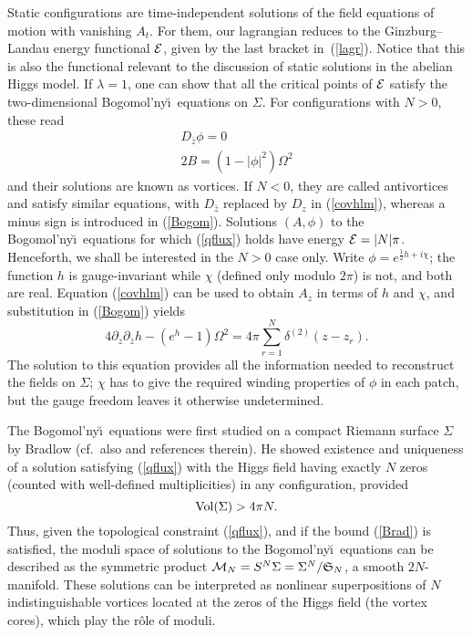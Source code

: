 \documentclass[a4paper,11pt]{article}
\begin{document}
Static configurations are time-independent solutions of the field 
equations of motion with vanishing $A_{t}$. For them, our lagrangian 
reduces to the
Ginzburg--Landau energy functional ${\cal E}$, given by the last 
bracket in~(\ref{lagr}). Notice that this is also the functional
relevant to the discussion of static solutions in the abelian Higgs
model.
If $\lambda=1$, one can show that all the critical points of ${\cal E}$ 
satisfy the two-dimensional Bogomol'ny\u \i\ equations \cite{Bo} on 
$\Sigma$. For configurations with $N>0$, these read
\begin{eqnarray}
&D_{\bar{z}}\phi=0 &\label{covhlm} \\
&2 B=(1-|\phi|^{2})\Omega^{2}&\label{Bogom}
\end{eqnarray}
and their solutions are known as vortices. If $N<0$, they are called
antivortices and satisfy similar equations, with $D_{\bar{z}}$ 
replaced by $D_{z}$ in (\ref{covhlm}), whereas a minus sign is introduced
in (\ref{Bogom}). 
Solutions $(A,\phi)$ to the Bogomol'ny\u\i\ equations for which (\ref{qflux})
holds have 
energy ${\cal E}=|N|\pi$. 
Henceforth, we shall be interested in the $N>0$ case only.
Write $\phi=e^{\frac{1}{2}h+i\chi}$; the function $h$ is gauge-invariant
while $\chi$ (defined only modulo $2\pi$) is not, and both are real.
Equation (\ref{covhlm}) can be used to obtain $A_{z}$ in terms of $h$
and $\chi$, and substitution in (\ref{Bogom}) yields
\begin{equation} \label{newBogom}
4\partial_{z}\partial_{\bar{z}}h-(e^{h}-1)\Omega^{2}=
4\pi\sum_{r=1}^{N}\delta^{(2)}(z-z_{r}).
\end{equation}
The solution to this equation provides all the information needed to 
reconstruct the fields on $\Sigma$; $\chi$ has to give
the required winding properties of $\phi$ in each patch, but the gauge
freedom leaves it otherwise undetermined.


The Bogomol'ny\u \i\ equations were first studied on a compact Riemann 
surface $\Sigma$ by Bradlow \cite{Br} (cf.~also \cite{GP} and
references therein). 
He showed existence and  uniqueness of a 
solution satisfying (\ref{qflux}) with the Higgs field having exactly 
$N$ zeros (counted with well-defined
multiplicities) in any configuration, provided
\begin{equation}\label{Brad}
{\rm Vol}(\Sigma) > 4\pi N.
\end{equation}
Thus, given the topological constraint (\ref{qflux}), and
if the bound (\ref{Brad}) is satisfied, the moduli space of
solutions to the Bogomol'ny\u\i\ equations 
can be described as the
symmetric product ${\cal M}_{N}=S^{N}\Sigma=\Sigma^{N}/\mathfrak{S}_{N}$, 
a smooth $2N$-manifold. These solutions can be interpreted as
nonlinear superpositions of $N$ indistinguishable vortices
located at the zeros of the Higgs field (the vortex cores), which play
the r\^ole of moduli. 
\end{document}
